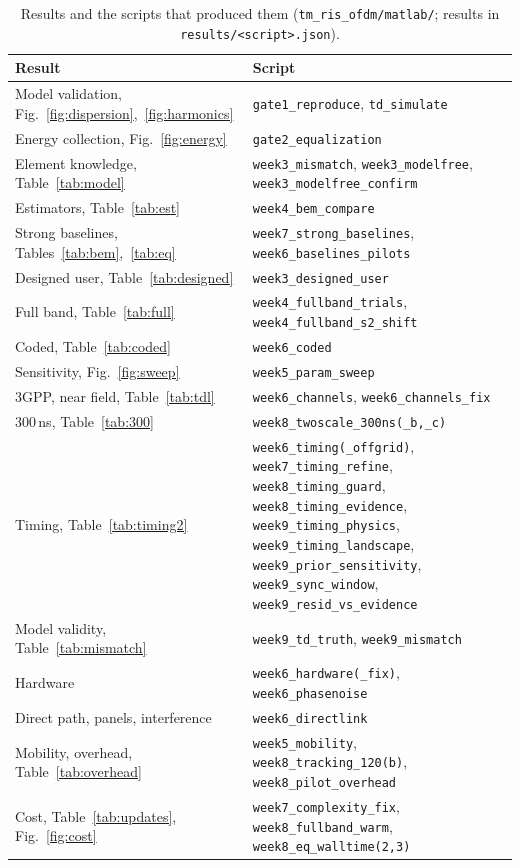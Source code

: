\begin{table}[h]\centering
\caption{Results and the scripts that produced them (\texttt{tm\_ris\_ofdm/matlab/}; results in \texttt{results/<script>.json}).}\label{tab:repro}
\small\begin{tabular}{p{5.6cm}p{9.6cm}}\toprule
Result & Script \\\midrule
Model validation, Fig.~\ref{fig:dispersion},~\ref{fig:harmonics} & \texttt{gate1\_reproduce}, \texttt{td\_simulate} \\
Energy collection, Fig.~\ref{fig:energy} & \texttt{gate2\_equalization} \\
Element knowledge, Table~\ref{tab:model} & \texttt{week3\_mismatch}, \texttt{week3\_modelfree}, \texttt{week3\_modelfree\_confirm} \\
Estimators, Table~\ref{tab:est} & \texttt{week4\_bem\_compare} \\
Strong baselines, Tables~\ref{tab:bem},~\ref{tab:eq} & \texttt{week7\_strong\_baselines}, \texttt{week6\_baselines\_pilots} \\
Designed user, Table~\ref{tab:designed} & \texttt{week3\_designed\_user} \\
Full band, Table~\ref{tab:full} & \texttt{week4\_fullband\_trials}, \texttt{week4\_fullband\_s2\_shift} \\
Coded, Table~\ref{tab:coded} & \texttt{week6\_coded} \\
Sensitivity, Fig.~\ref{fig:sweep} & \texttt{week5\_param\_sweep} \\
3GPP, near field, Table~\ref{tab:tdl} & \texttt{week6\_channels}, \texttt{week6\_channels\_fix} \\
300\,ns, Table~\ref{tab:300} & \texttt{week8\_twoscale\_300ns(\_b,\_c)} \\
Timing, Table~\ref{tab:timing2} & \texttt{week6\_timing(\_offgrid)}, \texttt{week7\_timing\_refine}, \texttt{week8\_timing\_guard}, \texttt{week8\_timing\_evidence}, \texttt{week9\_timing\_physics}, \texttt{week9\_timing\_landscape}, \texttt{week9\_prior\_sensitivity}, \texttt{week9\_sync\_window}, \texttt{week9\_resid\_vs\_evidence} \\
Model validity, Table~\ref{tab:mismatch} & \texttt{week9\_td\_truth}, \texttt{week9\_mismatch} \\
Hardware & \texttt{week6\_hardware(\_fix)}, \texttt{week6\_phasenoise} \\
Direct path, panels, interference & \texttt{week6\_directlink} \\
Mobility, overhead, Table~\ref{tab:overhead} & \texttt{week5\_mobility}, \texttt{week8\_tracking\_120(b)}, \texttt{week8\_pilot\_overhead} \\
Cost, Table~\ref{tab:updates}, Fig.~\ref{fig:cost} & \texttt{week7\_complexity\_fix}, \texttt{week8\_fullband\_warm}, \texttt{week8\_eq\_walltime(2,3)} \\\bottomrule
\end{tabular}
\end{table}
